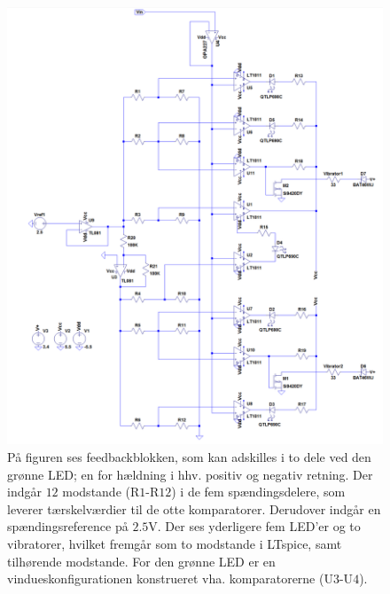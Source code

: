 \begin{figure}[H] 
	\centering
	\includegraphics[scale=0.4]{figures/cProblemloesning/komparator_uden_vaerdi.PNG}
	\caption{På figuren ses feedbackblokken, som kan adskilles i to dele ved den grønne LED; en for hældning i hhv. positiv og negativ retning. Der indgår $12$ modstande (R$1$-R$12$) i de fem spændingsdelere, som leverer tærskelværdier til de otte komparatorer. Derudover indgår en spændingsreference på $2.5$V. Der ses yderligere fem LED'er og to vibratorer, hvilket fremgår som to modstande i LTspice, samt tilhørende modstande. For den grønne LED er en vindueskonfigurationen konstrueret vha. komparatorerne (U$3$-U$4$).}
	\label{fig:komparator_uden_vaerdi}
\end{figure}


